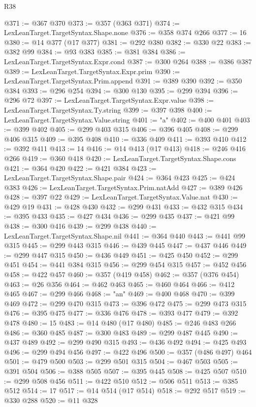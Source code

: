 \begin{lexlean}{R38}
\begin{coremodule}
@371 := @367 @370
@373 := @357 (@363 @371)
@374 := LexLeanTarget.TargetSyntax.Shape.none
@376 := @358 @374 @266
@377 := 16
@380 := @14 @377 (@17 @377)
@381 := @292 @380
@382 := @330 @22
@383 := @382 @99
@384 := @93 @383
@385 := @381 @384
@386 := LexLeanTarget.TargetSyntax.Expr.cond
@387 := @300 @264
@388 := @386 @387
@389 := LexLeanTarget.TargetSyntax.Expr.prim
@390 := LexLeanTarget.TargetSyntax.Prim.append
@391 := @389 @390
@392 := @350 @384
@393 := @296 @254
@394 := @300 @130
@395 := @299 @394
@396 := @296 @72
@397 := LexLeanTarget.TargetSyntax.Expr.value
@398 := LexLeanTarget.TargetSyntax.Ty.string
@399 := @397 @398
@400 := LexLeanTarget.TargetSyntax.Value.string
@401 := "a"
@402 := @400 @401
@403 := @399 @402
@405 := @299 @403 @315
@406 := @396 @405
@408 := @299 @406 @315
@409 := @395 @408
@410 := @336 @409
@411 := @393 @410
@412 := @392 @411
@413 := 14
@416 := @14 @413 (@17 @413)
@418 := @246 @416 @266
@419 := @360 @418
@420 := LexLeanTarget.TargetSyntax.Shape.cons
@421 := @364 @420
@422 := @421 @384
@423 := LexLeanTarget.TargetSyntax.Shape.pair
@424 := @364 @423
@425 := @424 @383
@426 := LexLeanTarget.TargetSyntax.Prim.natAdd
@427 := @389 @426
@428 := @397 @22
@429 := LexLeanTarget.TargetSyntax.Value.nat
@430 := @429 @19
@431 := @428 @430
@432 := @299 @431
@433 := @432 @315
@434 := @395 @433
@435 := @427 @434
@436 := @299 @435
@437 := @421 @99
@438 := @300 @416
@439 := @299 @438
@440 := LexLeanTarget.TargetSyntax.Shape.nil
@441 := @364 @440
@443 := @441 @99 @315
@445 := @299 @443 @315
@446 := @439 @445
@447 := @437 @446
@449 := @299 @447 @315
@450 := @436 @449
@451 := @425 @450
@452 := @299 @451
@454 := @441 @384 @315
@456 := @299 @454 @315
@457 := @452 @456
@458 := @422 @457
@460 := @357 (@419 @458)
@462 := @357 (@376 @454)
@463 := @26 @356
@464 := @462 @463
@465 := @460 @464
@466 := @412 @465
@467 := @299 @466
@468 := "an"
@469 := @400 @468
@470 := @399 @469
@472 := @299 @470 @315
@473 := @396 @472
@475 := @299 @473 @315
@476 := @395 @475
@477 := @336 @476
@478 := @393 @477
@479 := @392 @478
@480 := 15
@483 := @14 @480 (@17 @480)
@485 := @246 @483 @266
@486 := @360 @485
@487 := @300 @483
@489 := @299 @487 @445
@490 := @437 @489
@492 := @299 @490 @315
@493 := @436 @492
@494 := @425 @493
@496 := @299 @494 @456
@497 := @422 @496
@500 := @357 (@486 @497) @464
@501 := @479 @500
@503 := @299 @501 @315
@504 := @467 @503
@505 := @391 @504
@506 := @388 @505
@507 := @395 @445
@508 := @425 @507
@510 := @299 @508 @456
@511 := @422 @510
@512 := @506 @511
@513 := @385 @512
@514 := 17
@517 := @14 @514 (@17 @514)
@518 := @292 @517
@519 := @330 @288
@520 := @11 @328

\end{coremodule}
\end{lexlean}

